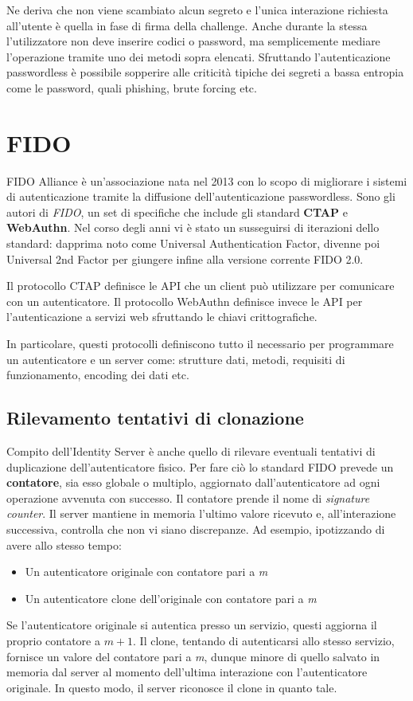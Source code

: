 Ne deriva che non viene scambiato alcun segreto e l'unica interazione richiesta all'utente è quella in fase di firma della challenge. Anche durante la stessa l'utilizzatore non deve inserire codici o password, ma semplicemente mediare l'operazione tramite uno dei metodi sopra elencati. Sfruttando l'autenticazione passwordless è possibile sopperire alle criticità tipiche dei segreti a bassa entropia come le password, quali phishing, brute forcing etc. 

\section{FIDO}
\label{fido}

FIDO Alliance è un'associazione nata nel 2013 con lo scopo di migliorare i sistemi di autenticazione tramite la diffusione dell'autenticazione passwordless. Sono gli autori di \emph{FIDO}, un set di specifiche che include gli standard \textbf{CTAP} e \textbf{WebAuthn}. Nel corso degli anni vi è stato un susseguirsi di iterazioni dello standard: dapprima noto come Universal Authentication Factor, divenne poi Universal 2nd Factor per giungere infine alla versione corrente FIDO 2.0. 

Il protocollo CTAP definisce le API che un client può utilizzare per comunicare con un autenticatore. Il protocollo WebAuthn definisce invece le API per l'autenticazione a servizi web sfruttando le chiavi crittografiche. 

In particolare, questi protocolli definiscono tutto il necessario per programmare un autenticatore e un server come: strutture dati, metodi, requisiti di funzionamento, encoding dei dati etc.

\subsection{Rilevamento tentativi di clonazione}
\label{fido:clonazione}

Compito dell'Identity Server è anche quello di rilevare eventuali tentativi di duplicazione dell'autenticatore fisico. Per fare ciò lo standard FIDO prevede un \textbf{contatore}, sia esso globale o multiplo, aggiornato dall'autenticatore ad ogni operazione avvenuta con successo. Il contatore prende il nome di \emph{signature counter}. Il server mantiene in memoria l'ultimo valore ricevuto e, all'interazione successiva, controlla che non vi siano discrepanze. Ad esempio, ipotizzando di avere allo stesso tempo:
\begin{itemize}
	\item Un autenticatore originale con contatore pari a \emph{m}
	\item Un autenticatore clone dell'originale con contatore pari a \emph{m}
\end{itemize}
Se l'autenticatore originale si autentica presso un servizio, questi aggiorna il proprio contatore a ${m+1}$. Il clone, tentando di autenticarsi allo stesso servizio, fornisce un valore del contatore pari a \emph{m}, dunque minore di quello salvato in memoria dal server al momento dell'ultima interazione con l'autenticatore originale. In questo modo, il server riconosce il clone in quanto tale. 

